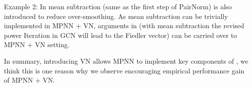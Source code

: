 \documentclass[nohyperref]{article}
\theoremstyle{plain}
\theoremstyle{definition}
\theoremstyle{remark}
\begin{document}
Example 2: In \cite{yang2020revisiting} mean subtraction (same as the first step of PairNorm) is also introduced to reduce over-smoothing. As mean subtraction can be trivially implemented in MPNN + VN, arguments in \citep{yang2020revisiting} (with mean subtraction the revised power Iteration in GCN will lead to the Fiedler vector) can be carried over to MPNN + VN setting. 

In summary, introducing VN allows MPNN to implement key components of \cite{yang2020revisiting,zhao2019pairnorm}, we think this is one reason why we observe encouraging empirical performance gain of MPNN + VN. 
\end{document}
